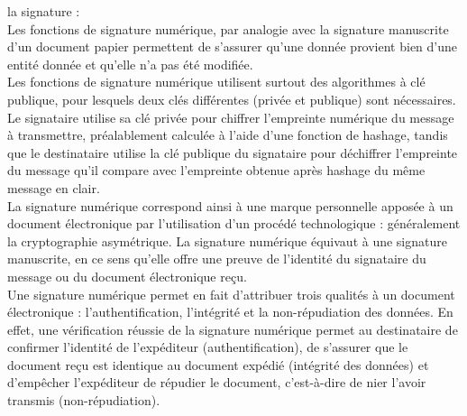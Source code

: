 \begin{itemize}
\begin{comment}
	SHA1 (Secure Hash Algorithm) : cette fonction de hashage crée dese hash sur 160 bits. Cet algorithme est lui aussi progressivement remplacé par le SHA256, beaucoup moins facile a casser grâce à son empreinte sur 256 bits.
	\end{comment}
	\begin{comment}
		peut se faire par brute force\footnote{Tests de l'ensemble des combinaisons possibles} si l’on a beaucoup de puissance de calcul et de temps, par dictionnaire (on parcourt successivement les mots de passe les plus courants), en utilisant des dictionnaires\footnote{Ensemble de hash précalculées avec un algorithme de hashage} qui permettent de retrouver le mot de passe à partir du hash ou encore plus efficacement 
		Cette dernière technique reste la plus efficace pour retrouver un mot de passe faible, à condition d’avoir accès au hash d’origine. On peut l’imaginer comme une grosse HashMap dont la clé serait l’empreinte et la valeur la donnée d’origine. Les mots de passe les plus simples ont donc de grandes chances de s’y retrouver.
	\end{comment}
	\itemtirait la signature \cite{signature-wikipedia} : \\
	Les fonctions de signature numérique, par analogie avec la signature manuscrite d’un document papier permettent de s'assurer qu'une donnée provient bien d'une entité donnée et qu'elle n'a pas été modifiée.\\
	Les fonctions de signature numérique utilisent surtout des algorithmes à clé publique, pour lesquels deux clés différentes (privée et publique) sont nécessaires. Le signataire utilise sa clé privée pour chiffrer l'empreinte numérique du message à transmettre, préalablement calculée à l'aide d'une fonction de hashage, tandis que le destinataire utilise la clé publique du signataire pour déchiffrer l'empreinte du message qu'il compare avec l'empreinte obtenue après hashage du même message en clair.\\ 
	La signature numérique correspond ainsi à une marque personnelle apposée à un document électronique par l'utilisation d'un procédé technologique : généralement la cryptographie asymétrique. La signature numérique équivaut à une signature manuscrite, en ce sens qu'elle offre une preuve de l'identité du signataire du message ou du document électronique reçu.\\ 
	Une signature numérique permet en fait d'attribuer trois qualités à un document électronique : l'authentification, l'intégrité et la non-répudiation des données. En effet, une vérification réussie de la signature numérique permet au destinataire de confirmer l'identité de l'expéditeur (authentification), de s'assurer que le document reçu est identique au document expédié (intégrité des données) et d'empêcher l'expéditeur de répudier le document, c'est-à-dire de nier l'avoir transmis (non-répudiation).  
\end{itemize}

